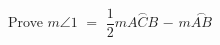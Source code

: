 \documentclass[preview]{standalone}
\begin{document}
\begin{center}
Prove $m\angle{1}$ $=$ $\dfrac{1}{2}$$m\overset{\frown}{ACB}$ $-$ $m{\overset{\frown}{AB}}$
\end{center}
\end{document}
